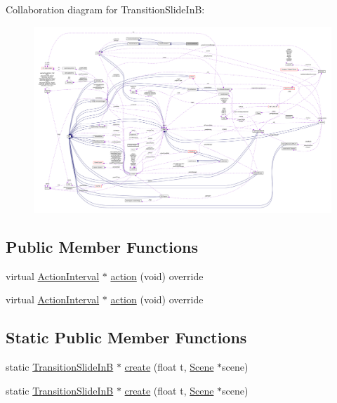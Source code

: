 Collaboration diagram for Transition\+Slide\+InB\+:
\nopagebreak
\begin{figure}[H]
\begin{center}
\leavevmode
\includegraphics[width=350pt]{classTransitionSlideInB__coll__graph}
\end{center}
\end{figure}
\subsection*{Public Member Functions}
\begin{DoxyCompactItemize}
\item 
virtual \hyperlink{classActionInterval}{Action\+Interval} $\ast$ \hyperlink{classTransitionSlideInB_ad67db28968c6152f4412bb86fd0fd4ef}{action} (void) override
\item 
virtual \hyperlink{classActionInterval}{Action\+Interval} $\ast$ \hyperlink{classTransitionSlideInB_a512b4ad5aae8a5b408438a535a4b146e}{action} (void) override
\end{DoxyCompactItemize}
\subsection*{Static Public Member Functions}
\begin{DoxyCompactItemize}
\item 
static \hyperlink{classTransitionSlideInB}{Transition\+Slide\+InB} $\ast$ \hyperlink{classTransitionSlideInB_ae5ffc089db1f0879b9c7c8ab0fa31149}{create} (float t, \hyperlink{classScene}{Scene} $\ast$scene)
\item 
static \hyperlink{classTransitionSlideInB}{Transition\+Slide\+InB} $\ast$ \hyperlink{classTransitionSlideInB_a85fe3fe46d29809ef13f9705ce72f9d1}{create} (float t, \hyperlink{classScene}{Scene} $\ast$scene)
\end{DoxyCompactItemize}
